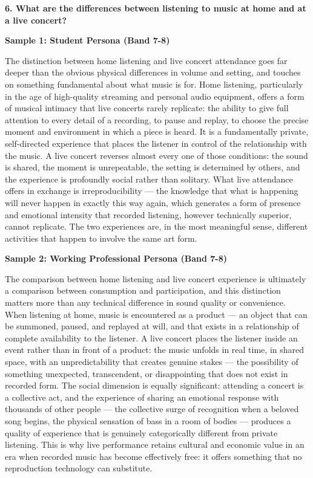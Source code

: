 \separator

\begin{ieltsquestion}
\textbf{6. What are the differences between listening to music at home and at a live concert?}
\end{ieltsquestion}
\textbf{Sample 1: Student Persona (Band 7-8)}

The distinction between home listening and live concert attendance goes far deeper than the obvious physical differences in volume and setting, and touches on something fundamental about what music is for. Home listening, particularly in the age of high-quality streaming and personal audio equipment, offers a form of musical intimacy that live concerts rarely replicate: the ability to give full attention to every detail of a recording, to pause and replay, to choose the precise moment and environment in which a piece is heard. It is a fundamentally private, self-directed experience that places the listener in control of the relationship with the music. A live concert reverses almost every one of those conditions: the sound is shared, the moment is unrepeatable, the setting is determined by others, and the experience is profoundly social rather than solitary. What live attendance offers in exchange is irreproducibility — the knowledge that what is happening will never happen in exactly this way again, which generates a form of presence and emotional intensity that recorded listening, however technically superior, cannot replicate. The two experiences are, in the most meaningful sense, different activities that happen to involve the same art form.

\textbf{Sample 2: Working Professional Persona (Band 7-8)}

The comparison between home listening and live concert experience is ultimately a comparison between consumption and participation, and this distinction matters more than any technical difference in sound quality or convenience. When listening at home, music is encountered as a product — an object that can be summoned, paused, and replayed at will, and that exists in a relationship of complete availability to the listener. A live concert places the listener inside an event rather than in front of a product: the music unfolds in real time, in shared space, with an unpredictability that creates genuine stakes — the possibility of something unexpected, transcendent, or disappointing that does not exist in recorded form. The social dimension is equally significant: attending a concert is a collective act, and the experience of sharing an emotional response with thousands of other people — the collective surge of recognition when a beloved song begins, the physical sensation of bass in a room of bodies — produces a quality of experience that is genuinely categorically different from private listening. This is why live performance retains cultural and economic value in an era when recorded music has become effectively free: it offers something that no reproduction technology can substitute.

